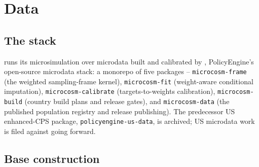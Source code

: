 \section{Data}
\label{sec:data}

\subsection{The \microcosm{} stack}
\label{sec:microcosm-stack}

\policyengineus{} runs its microsimulation over microdata built and
calibrated by \microcosm{}, PolicyEngine's open-source microdata stack: a
monorepo of five packages -- \texttt{microcosm-frame} (the weighted
sampling-frame kernel), \texttt{microcosm-fit} (weight-aware conditional
imputation), \texttt{microcosm-calibrate} (targets-to-weights calibration),
\texttt{microcosm-build} (country build plans and release gates), and
\texttt{microcosm-data} (the published population registry and release
publishing).
The predecessor US enhanced-CPS package, \texttt{policyengine-us-data}, is
archived; US microdata work is filed against \microcosm{} going forward.

\subsection{Base construction}
\label{sec:base-construction}

